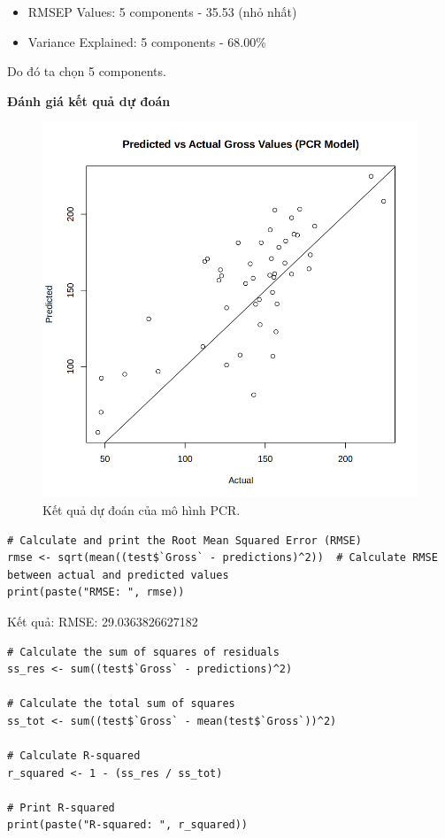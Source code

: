 \begin{itemize}
    \item RMSEP Values: 5 components - 35.53 (nhỏ nhất)
    \item Variance Explained: 5 components - 68.00\%
\end{itemize}
Do đó ta chọn 5 components.

\textbf{Đánh giá kết quả dự đoán}

\begin{figure}[H]
    \centering
    \includegraphics[width=0.75\columnwidth]{csm_figures/pcr_predict_part01.png}
    \caption{Kết quả dự đoán của mô hình PCR.}
    \label{fig:pcr_predict_part01}
\end{figure}

\begin{lstlisting}
# Calculate and print the Root Mean Squared Error (RMSE)
rmse <- sqrt(mean((test$`Gross` - predictions)^2))  # Calculate RMSE between actual and predicted values
print(paste("RMSE: ", rmse)) 
\end{lstlisting}

Kết quả: RMSE:  29.0363826627182

\begin{lstlisting}
# Calculate the sum of squares of residuals
ss_res <- sum((test$`Gross` - predictions)^2)

# Calculate the total sum of squares
ss_tot <- sum((test$`Gross` - mean(test$`Gross`))^2)

# Calculate R-squared
r_squared <- 1 - (ss_res / ss_tot)

# Print R-squared
print(paste("R-squared: ", r_squared))
\end{lstlisting}

